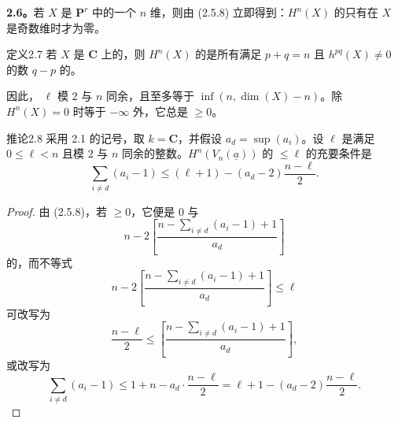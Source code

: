 \textbf{2.6。}若 $X$ 是 $\mathbf P^r$ 中的一个 $n$ 维，则由 (2.5.8) 立即得到：$H^n(X)$ 的只有在 $X$ 是奇数维时才为零。

\begin{SGAresult}{定义}{2.7}
若 $X$ 是 $\mathbf C$ 上的，则 $H^n(X)$ 的是所有满足 $p+q=n$ 且 $h^{pq}(X)\ne0$ 的数 $q-p$ 的。
\end{SGAresult}
因此， $\ell$ 模 $2$ 与 $n$ 同余，且至多等于 $\inf(n,\dim(X)-n)$。除 $H^n(X)=0$ 时等于 $-\infty$ 外，它总是 $\geq0$。

\begin{SGAresult}{推论}{2.8}
采用 2.1 的记号，取 $k=\mathbf C$，并假设 $a_d=\sup(a_i)$。设 $\ell$ 是满足 $0\leq\ell<n$ 且模 $2$ 与 $n$ 同余的整数。$H^n(V_n(\underline a))$ 的 $\leq\ell$ 的充要条件是
\[
 \sum_{i\ne d}(a_i-1)\leq(\ell+1)-(a_d-2)\frac{n-\ell}{2}.
\]
\end{SGAresult}
\begin{proof}
由 (2.5.8)，若 $\geq0$，它便是 $0$ 与
\[
 n-2\left[\frac{n-\sum_{i\ne d}(a_i-1)+1}{a_d}\right]
\]
的，而不等式
\[
 n-2\left[\frac{n-\sum_{i\ne d}(a_i-1)+1}{a_d}\right]\leq\ell
\]
可改写为
\[
 \frac{n-\ell}{2}\leq\left[\frac{n-\sum_{i\ne d}(a_i-1)+1}{a_d}\right],
\]
或改写为
\[
 \sum_{i\ne d}(a_i-1)\leq1+n-a_d\cdot\frac{n-\ell}{2}
 =\ell+1-(a_d-2)\frac{n-\ell}{2}.
\]
\end{proof}

